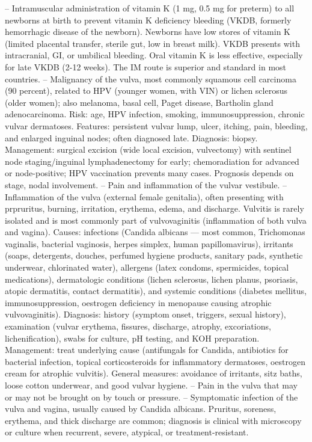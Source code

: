 -- Intramuscular administration of vitamin K (1 mg, 0.5 mg for preterm) to all newborns at birth to prevent vitamin K deficiency bleeding (VKDB, formerly hemorrhagic disease of the newborn). Newborns have low stores of vitamin K (limited placental transfer, sterile gut, low in breast milk). VKDB presents with intracranial, GI, or umbilical bleeding. Oral vitamin K is less effective, especially for late VKDB (2-12 weeks). The IM route is superior and standard in most countries.
-- Malignancy of the vulva, most commonly squamous cell carcinoma (90 percent), related to HPV (younger women, with VIN) or lichen sclerosus (older women); also melanoma, basal cell, Paget disease, Bartholin gland adenocarcinoma. Risk: age, HPV infection, smoking, immunosuppression, chronic vulvar dermatoses. Features: persistent vulvar lump, ulcer, itching, pain, bleeding, and enlarged inguinal nodes; often diagnosed late. Diagnosis: biopsy. Management: surgical excision (wide local excision, vulvectomy) with sentinel node staging/inguinal lymphadenectomy for early; chemoradiation for advanced or node-positive; HPV vaccination prevents many cases. Prognosis depends on stage, nodal involvement.
-- Pain and inflammation of the vulvar vestibule.
-- Inflammation of the vulva (external female genitalia), often presenting with prpruritus, burning, irritation, erythema, edema, and discharge. Vulvitis is rarely isolated and is most commonly part of vulvovaginitis (inflammation of both vulva and vagina). Causes: infections (Candida albicans — most common, Trichomonas vaginalis, bacterial vaginosis, herpes simplex, human papillomavirus), irritants (soaps, detergents, douches, perfumed hygiene products, sanitary pads, synthetic underwear, chlorinated water), allergens (latex condoms, spermicides, topical medications), dermatologic conditions (lichen sclerosus, lichen planus, psoriasis, atopic dermatitis, contact dermatitis), and systemic conditions (diabetes mellitus, immunosuppression, oestrogen deficiency in menopause causing atrophic vulvovaginitis). Diagnosis: history (symptom onset, triggers, sexual history), examination (vulvar erythema, fissures, discharge, atrophy, excoriations, lichenification), swabs for culture, pH testing, and KOH preparation. Management: treat underlying cause (antifungals for Candida, antibiotics for bacterial infection, topical corticosteroids for inflammatory dermatoses, oestrogen cream for atrophic vulvitis). General measures: avoidance of irritants, sitz baths, loose cotton underwear, and good vulvar hygiene.
-- Pain in the vulva that may or may not be brought on by touch or pressure.
-- Symptomatic infection of the vulva and vagina, usually caused by Candida albicans. Pruritus, soreness, erythema, and thick discharge are common; diagnosis is clinical with microscopy or culture when recurrent, severe, atypical, or treatment-resistant.

